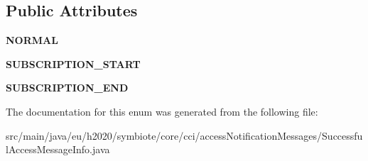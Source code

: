 \subsection*{Public Attributes}
\begin{DoxyCompactItemize}
\item 
\mbox{\label{enumeu_1_1h2020_1_1symbiote_1_1core_1_1cci_1_1accessNotificationMessages_1_1SuccessfulAccessMessageInfo_1_1AccessType_a8f140e33b5482a07a828b76f8425b2ff}} 
{\bfseries N\+O\+R\+M\+AL}
\item 
\mbox{\label{enumeu_1_1h2020_1_1symbiote_1_1core_1_1cci_1_1accessNotificationMessages_1_1SuccessfulAccessMessageInfo_1_1AccessType_aaf391c1c0aa9f99ce2b6c3391a54f39b}} 
{\bfseries S\+U\+B\+S\+C\+R\+I\+P\+T\+I\+O\+N\+\_\+\+S\+T\+A\+RT}
\item 
\mbox{\label{enumeu_1_1h2020_1_1symbiote_1_1core_1_1cci_1_1accessNotificationMessages_1_1SuccessfulAccessMessageInfo_1_1AccessType_a5ac489e4ba7c15deac22356d567f383a}} 
{\bfseries S\+U\+B\+S\+C\+R\+I\+P\+T\+I\+O\+N\+\_\+\+E\+ND}
\end{DoxyCompactItemize}


The documentation for this enum was generated from the following file\+:\begin{DoxyCompactItemize}
\item 
src/main/java/eu/h2020/symbiote/core/cci/access\+Notification\+Messages/Successful\+Access\+Message\+Info.\+java\end{DoxyCompactItemize}
